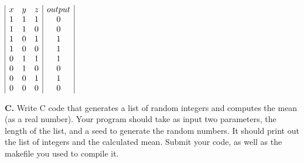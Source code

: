 \documentclass{exam}
\begin{document}
\begin{questions}
$\begin{array}{|c c c | c|}
x&y&z&output\\
1&1&1&0\\
1&1&0&0\\
1&0&1&1\\ %
1&0&0&1\\ %
0&1&1&1\\ %
0&1&0&0\\
0&0&1&1\\ %
0&0&0&0
\end{array}$


\question[16]
\textbf{C.}
Write C code that generates a list of random integers and computes the mean (as a real number). 
Your program should take as input two parameters, the length of the list, and a seed to generate the random numbers.
It should print out the list of integers and the calculated mean. 
Submit your code, as well as the makefile you used to compile it. 
\end{questions}
\end{document}
